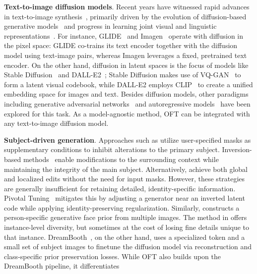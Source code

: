 \textbf{Text-to-image diffusion models}. Recent years have witnessed rapid advances in text-to-image synthesis~\cite{saharia2022photorealistic,ramesh2022hierarchical,rombach2022high,gu2022vector,nichol2022glide}, primarily driven by the evolution of diffusion-based generative models~\cite{ho2020denoising,song2021score,song2021denoising,dhariwal2021diffusion} and progress in learning joint visual and linguistic representations~\cite{su2020vlbert,lu2019vilbert,radford2021learning,wang2021simvlm,li2022blip,li2023blip,alayrac2022flamingo,schuhmann2022laion}. For instance, GLIDE~\cite{nichol2022glide} and Imagen~\cite{saharia2022photorealistic} operate with diffusion in the pixel space: GLIDE co-trains its text encoder together with the diffusion model using text-image pairs, whereas Imagen leverages a fixed, pretrained text encoder. On the other hand, diffusion in latent spaces is the focus of models like Stable Diffusion~\cite{rombach2022high} and DALL-E2~\cite{ramesh2022hierarchical}; Stable Diffusion makes use of VQ-GAN~\cite{esser2021taming} to form a latent visual codebook, while DALL-E2 employs CLIP~\cite{radford2021learning} to create a unified embedding space for images and text. Besides diffusion models, other paradigms including generative adversarial networks~\cite{reed2016generative,zhang2017stackgan,xu2018attngan,li2019controllable} and autoregressive models~\cite{ramesh2021zero,ding2021cogview,wu2022nuwa,yuscaling} have been explored for this task. As a model-agnostic method, OFT can be integrated with any text-to-image diffusion model.

\textbf{Subject-driven generation}. Approaches such as \cite{avrahami2022blended,nichol2022glide} utilize user-specified masks as supplementary conditions to inhibit alterations to the primary subject. Inversion-based methods~\cite{choi2021ilvr,dhariwal2021diffusion,ramesh2022hierarchical,gal2022image} enable modifications to the surrounding context while maintaining the integrity of the main subject. Alternatively, \cite{hertz2022prompt} achieve both global and localized edits without the need for input masks. However, these strategies are generally insufficient for retaining detailed, identity-specific information. Pivotal Tuning~\cite{roich2022pivotal} mitigates this by adjusting a generator near an inverted latent code while applying identity-preserving regularization. Similarly, \cite{nitzan2022mystyle} constructs a person-specific generative face prior from multiple images. The method in \cite{casanova2021instance} offers instance-level diversity, but sometimes at the cost of losing fine details unique to that instance. DreamBooth~\cite{ruiz2023dreambooth}, on the other hand, uses a specialized token and a small set of subject images to finetune the diffusion model via reconstruction and class-specific prior preservation losses. While OFT also builds upon the DreamBooth pipeline, it differentiates

